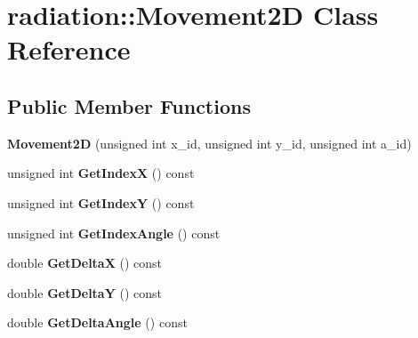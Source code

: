 \hypertarget{classradiation_1_1_movement2_d}{}\section{radiation\+:\+:Movement2D Class Reference}
\label{classradiation_1_1_movement2_d}
\subsection*{Public Member Functions}
\begin{DoxyCompactItemize}
\item 
\hypertarget{classradiation_1_1_movement2_d_a20ffb2ea6de1ea21c63cc30831b79cf2}{}\label{classradiation_1_1_movement2_d_a20ffb2ea6de1ea21c63cc30831b79cf2} 
{\bfseries Movement2D} (unsigned int x\+\_\+id, unsigned int y\+\_\+id, unsigned int a\+\_\+id)
\item 
\hypertarget{classradiation_1_1_movement2_d_a6fafa5a62ef55fa4faa7576db5ad6803}{}\label{classradiation_1_1_movement2_d_a6fafa5a62ef55fa4faa7576db5ad6803} 
unsigned int {\bfseries Get\+IndexX} () const
\item 
\hypertarget{classradiation_1_1_movement2_d_a48ae713cd6ac0ad4fd7b9d9c51dc9575}{}\label{classradiation_1_1_movement2_d_a48ae713cd6ac0ad4fd7b9d9c51dc9575} 
unsigned int {\bfseries Get\+IndexY} () const
\item 
\hypertarget{classradiation_1_1_movement2_d_a636a1038e19c6cc1d5519003e181dce5}{}\label{classradiation_1_1_movement2_d_a636a1038e19c6cc1d5519003e181dce5} 
unsigned int {\bfseries Get\+Index\+Angle} () const
\item 
\hypertarget{classradiation_1_1_movement2_d_a6c3af717a5163231c3e646b2d2622f10}{}\label{classradiation_1_1_movement2_d_a6c3af717a5163231c3e646b2d2622f10} 
double {\bfseries Get\+DeltaX} () const
\item 
\hypertarget{classradiation_1_1_movement2_d_afab01328c38d4059257fd0f22e1c8c12}{}\label{classradiation_1_1_movement2_d_afab01328c38d4059257fd0f22e1c8c12} 
double {\bfseries Get\+DeltaY} () const
\item 
\hypertarget{classradiation_1_1_movement2_d_a25b0443dfba841568fbbc851af1ba637}{}\label{classradiation_1_1_movement2_d_a25b0443dfba841568fbbc851af1ba637} 
double {\bfseries Get\+Delta\+Angle} () const
\end{DoxyCompactItemize}
